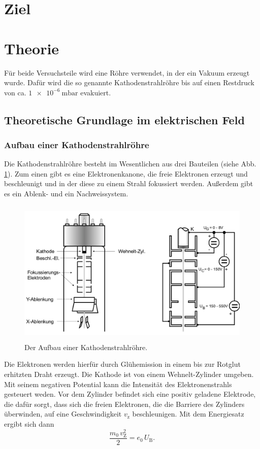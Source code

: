 \section{Ziel}

\section{Theorie}
\label{sec:Theorie}
Für beide Versuchsteile wird eine Röhre verwendet, in der ein
Vakuum erzeugt wurde. Dafür wird die so genannte Kathodenstrahlröhre 
bis auf einen Restdruck von ca. $\SI{1e-6}{\milli\bar}$
evakuiert. 

\subsection{Theoretische Grundlage im elektrischen Feld}

\subsubsection{Aufbau einer Kathodenstrahlröhre}
Die Kathodenstrahlröhre besteht im Wesentlichen aus drei 
Bauteilen (siehe Abb. \ref{fig:roehre}). Zum einen gibt es eine Elektronenkanone, die freie 
Elektronen erzeugt und beschleunigt und in der diese zu einem 
Strahl fokussiert werden. Außerdem gibt es ein Ablenk- und 
ein Nachweissystem.
\begin{figure}
    \centering
    \includegraphics[width=12cm, height=7cm]{build/roehre.png}
    \caption{Der Aufbau einer Kathodenstrahlröhre. \cite{V501}}
    \label{fig:roehre}
\end{figure}

\noindent Die Elektronen werden hierfür durch Glühemission in einem bis zur 
Rotglut erhitzten Draht erzeugt. 
Die Kathode ist von einem Wehnelt-Zylinder umgeben. Mit 
seinem negativen Potential kann die Intensität 
des Elektronenstrahls gesteuert weden. 
Vor dem Zylinder befindet sich eine positiv geladene 
Elektrode, die dafür sorgt, dass sich die freien Elektronen, 
die die Barriere des Zylinders überwinden, auf eine 
Geschwindigkeit $v_\text{z}$ beschleunigen. 
Mit dem Energiesatz ergibt sich dann 
\begin{equation}
    \frac{m_0 \, v_\text{Z}^2}{2} = e_\text{0} \, U_\text{B}.
    \label{eqn:energie}
\end{equation}

